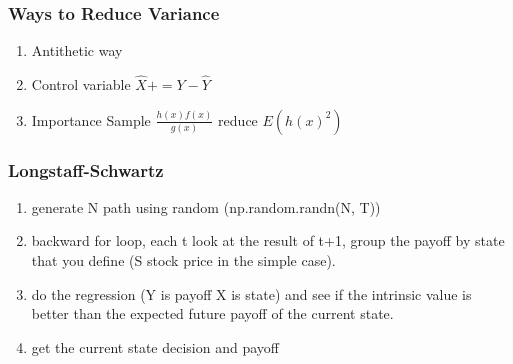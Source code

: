\subsubsection{Ways to Reduce Variance}
\begin{enumerate}
\item Antithetic way
\item Control variable $\hat{X} += Y - \hat{Y}$
\item Importance Sample $\frac{h(x)f(x)}{g(x)}$ reduce $E(h(x)^2)$
\end{enumerate}

\subsubsection{Longstaff-Schwartz}
\begin{enumerate}
\item generate N path using random (np.random.randn(N, T))
\item backward for loop, each t look at the result of t+1, group the payoff by state that you define (S stock price in the simple case).
\item do the regression (Y is payoff X is state) and see if the intrinsic value is better than the expected future payoff of the current state.
\item get the current state decision and payoff
\end{enumerate}
